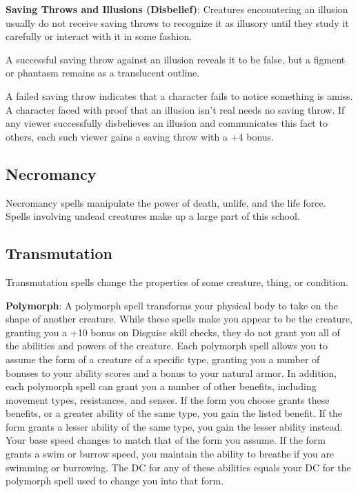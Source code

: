 \textbf{Saving Throws and Illusions (Disbelief)}: Creatures encountering an illusion usually do not receive saving throws to recognize it as illusory until they study it carefully or interact with it in some fashion.
				
A successful saving throw against an illusion reveals it to be false, but a figment or phantasm remains as a translucent outline.
				
A failed saving throw indicates that a character fails to notice something is amiss. A character faced with proof that an illusion isn't real needs no saving throw. If any viewer successfully disbelieves an illusion and communicates this fact to others, each such viewer gains a saving throw with a +4 bonus.
				
\subsection{Necromancy}

				
Necromancy spells manipulate the power of death, unlife, and the life force. Spells involving undead creatures make up a large part of this school. 
				
\subsection{Transmutation}

				
Transmutation spells change the properties of some creature, thing, or condition. 
				
\textbf{Polymorph}: A polymorph spell transforms your physical body to take on the shape of another creature. While these spells make you appear to be the creature, granting you a +10 bonus on Disguise skill checks, they do not grant you all of the abilities and powers of the creature. Each polymorph spell allows you to assume the form of a creature of a specific type, granting you a number of bonuses to your ability scores and a bonus to your natural armor. In addition, each polymorph spell can grant you a number of other benefits, including movement types, resistances, and senses. If the form you choose grants these benefits, or a greater ability of the same type, you gain the listed benefit. If the form grants a lesser ability of the same type, you gain the lesser ability instead. Your base speed changes to match that of the form you assume. If the form grants a swim or burrow speed, you maintain the ability to breathe if you are swimming or burrowing. The DC for any of these abilities equals your DC for the polymorph spell used to change you into that form. 
				
